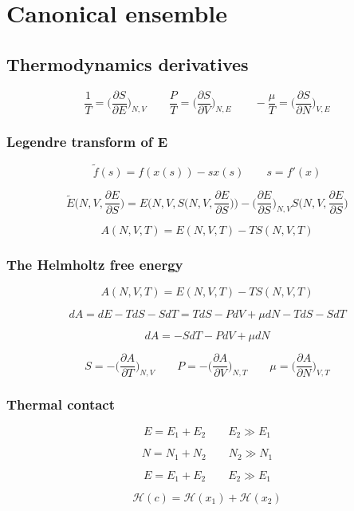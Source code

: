\chapter{Canonical ensemble}

\section{Thermodynamics derivatives}

$$\frac{1}{T} = \biggl(\frac{\partial S}{\partial E}\biggr)_{N, V}\qquad\frac{P}{T} = \biggl(\frac{\partial S}{\partial V}\biggr)_{N, E}\qquad -\frac{\mu}{T} = \biggl(\frac{\partial S}{\partial N}\biggr)_{V, E}$$

	\subsection{Legendre transform of E}

	$$\tilde{f}(s) = f(x(s))-sx(s)\qquad s = f'(x)$$

	$$\tilde{E}\biggl(N, V, \frac{\partial E}{\partial S}\biggr) = E\biggl(N, V, S\biggl(N, V, \frac{\partial E}{\partial S}\biggr)\biggr)-\biggl(\frac{\partial E}{\partial S}\biggr)_{N, V}S\biggl(N, V, \frac{\partial E}{\partial S}\biggr)$$

	$$A(N, V, T) = E(N, V, T)-TS(N, V, T)$$

	\subsection{The Helmholtz free energy}

	$$A(N, V, T) = E(N, V, T)-TS(N, V, T)$$

	$$dA = dE - TdS - SdT = TdS - PdV + \mu dN- TdS - SdT$$

	$$dA = -SdT - PdV +\mu dN$$

	$$S = -\biggl(\frac{\partial A}{\partial T}\biggr)_{N, V}\qquad P = -\biggl(\frac{\partial A}{\partial V}\biggr)_{N, T}\qquad \mu = \biggl(\frac{\partial A}{\partial N}\biggr)_{V, T}$$

	\subsection{Thermal contact}

	$$E = E_1 + E_2\qquad E_2\gg E_1$$

	$$N = N_1 + N_2\qquad N_2\gg N_1$$

	$$E = E_1 + E_2\qquad E_2\gg E_1$$

	$$\mathcal{H}(c) =\mathcal{H}(x_1)+\mathcal{H}(x_2)$$

